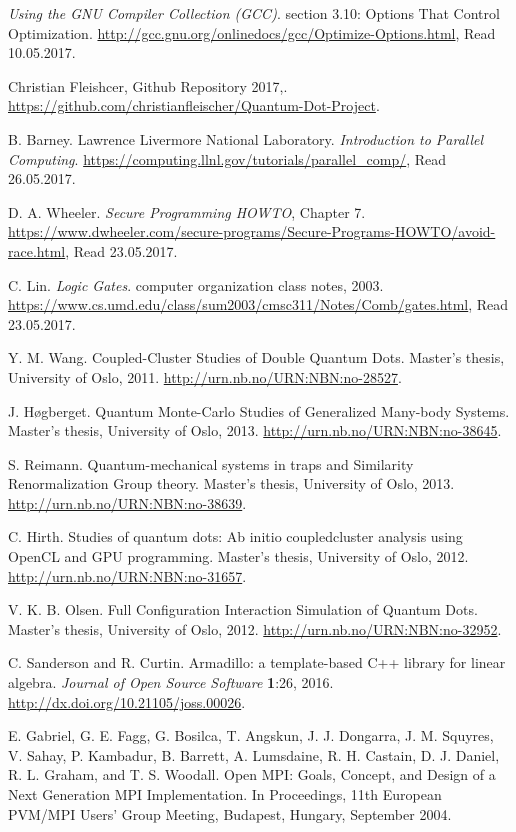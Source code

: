 \documentclass[../main.tex]{subfiles}
\begin{document}
\begin{thebibliography}{99}
 \emph{Using the GNU Compiler Collection (GCC)}. section 3.10: Options That Control Optimization. \url{http://gcc.gnu.org/onlinedocs/gcc/Optimize-Options.html}, Read 10.05.2017.

 Christian Fleishcer, Github Repository 2017,. \url{https://github.com/christianfleischer/Quantum-Dot-Project}.

 B. Barney. Lawrence Livermore National Laboratory. \emph{Introduction to Parallel Computing}. \url{https://computing.llnl.gov/tutorials/parallel_comp/}, Read 26.05.2017.

 D. A. Wheeler. \emph{Secure Programming HOWTO}, Chapter 7.  \url{https://www.dwheeler.com/secure-programs/Secure-Programs-HOWTO/avoid-race.html}, Read 23.05.2017.

 C. Lin. \emph{Logic Gates}. computer organization class notes, 2003. \url{https://www.cs.umd.edu/class/sum2003/cmsc311/Notes/Comb/gates.html}, Read 23.05.2017.

 Y. M. Wang. Coupled-Cluster Studies of Double Quantum
Dots. Master’s thesis, University of Oslo, 2011. \url{http://urn.nb.no/URN:NBN:no-28527}.

 J. Høgberget. Quantum Monte-Carlo Studies of Generalized Many-body Systems. 
Master’s thesis, University of Oslo, 2013. \url{http://urn.nb.no/URN:NBN:no-38645}.

 S. Reimann. Quantum-mechanical systems in traps and Similarity Renormalization Group theory. Master’s thesis, University of Oslo, 2013. \url{http://urn.nb.no/URN:NBN:no-38639}.

 C. Hirth. Studies of quantum dots: Ab initio coupledcluster analysis using OpenCL and GPU programming. Master’s thesis, University of Oslo, 2012. \url{http://urn.nb.no/URN:NBN:no-31657}.

 V. K. B. Olsen. Full Configuration Interaction Simulation of Quantum Dots. Master’s thesis, University of Oslo, 2012. \url{http://urn.nb.no/URN:NBN:no-32952}.

 C. Sanderson and R. Curtin. Armadillo: a template-based C++ library for linear algebra. 
\emph{Journal of Open Source Software} \textbf{1}:26, 2016. \url{http://dx.doi.org/10.21105/joss.00026}.

 E. Gabriel, G. E. Fagg, G. Bosilca, T. Angskun, J. J. Dongarra, J. M. Squyres, V. Sahay, P. Kambadur, B. Barrett, A. Lumsdaine, R. H. Castain, D. J. Daniel, R. L. Graham, and T. S. Woodall. Open MPI: Goals, Concept, and Design of a Next Generation MPI Implementation. In Proceedings, 11th European PVM/MPI Users' Group Meeting, Budapest, Hungary, September 2004.


\end{thebibliography}
\end{document}
